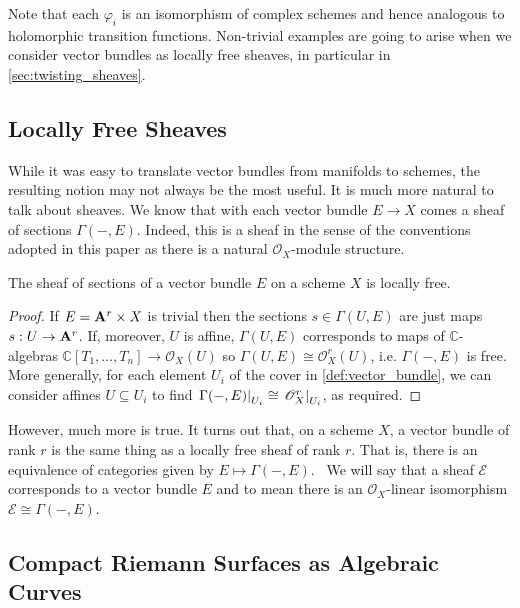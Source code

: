 \documentclass[12pt]{ociamthesis}  %
\begin{document}
Note that each $\varphi_i$ is an isomorphism of complex schemes
and hence analogous to holomorphic transition functions.
Non-trivial examples are going to arise when we consider vector bundles
as locally free sheaves, in particular in \ref{sec:twisting_sheaves}.

\subsection{Locally Free Sheaves}\label{sec:locally_free_sheaves}

While it was easy to translate vector bundles from manifolds
to schemes, the resulting notion may not always be the most
useful. It is much more natural to talk about sheaves. We know
that with each vector bundle $E\to X$ comes a sheaf of sections
$\Gamma(-,E)$. Indeed, this is a sheaf in the sense of the
conventions adopted in this paper as there is a natural
$\mathscr O_X$-module structure.

\begin{lemma}
  The sheaf of sections of a vector bundle $E$ on a scheme $X$ is
  locally free.
  \begin{proof}
    If $E=\mathbf{A}^{r}_{}\times X$ is
    trivial then the sections $s\in\Gamma(U,E)$ are just maps
    $s:U\to \mathbf{A}^{r}_{}$. If, moreover, $U$ is affine,
    $\Gamma(U,E)$ corresponds to maps of
    $\mathbb{C}$-algebras
    $\mathbb{C}[T_1,\ldots,T_n]\to\mathscr O_X(U)$ so
    $\Gamma(U,E)\cong \mathscr O^r_X(U)$, i.e. $\Gamma(-,E)$
    is free.
    More generally, for each element $U_i$ of the cover in
    \ref{def:vector_bundle}, we can consider affines $U\subseteq U_i$
    to find $\left.{\Gamma(-,E)}\right\vert_{U_i}\cong \left.{\mathscr O_X^r}\right\vert_{U_i}$,
    as required.
  \end{proof}
\end{lemma}

However, much more is true. It turns out that, on a scheme $X$,
a vector bundle of rank $r$ is the same thing as a locally
free sheaf of rank $r$. That is, there is an equivalence
of categories given by $E \mapsto \Gamma(-,E)$.~\cite[128-129]{hartshorne1977}
We will say that a sheaf $\mathscr E$ corresponds to a vector bundle
$E$ and to mean there is an $\mathscr O_X$-linear isomorphism
$\mathscr E\cong\Gamma(-,E)$.

\subsection{Compact Riemann Surfaces as Algebraic Curves}
\label{sec:surfaces_as_curves}
\end{document}
